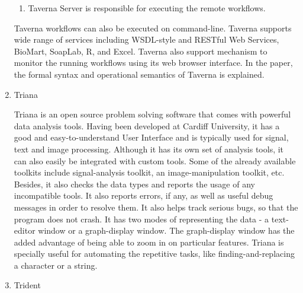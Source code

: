 \begin{enumerate}
\begin{enumerate}
\item {} 
Taverna Server is responsible for executing the remote
workflows.

\end{enumerate}

Taverna workflows can also be executed on command-line.  Taverna
supports wide range of services including WSDL-style and RESTful
Web Services, BioMart, SoapLab, R, and Excel. Taverna also support
mechanism to monitor the running workflows using its web browser
interface.  In the \label{\detokenize{i524/technologies:id13}}{\hyperref[\detokenize{i524/technologies:taverna-paper}]{\sphinxcrossref{{[}13{]}}}} paper, the formal syntax
and operational semantics of Taverna is explained.

\item {} 
Triana

\label{\detokenize{i524/technologies:id14}}{\hyperref[\detokenize{i524/technologies:trianadocumentation-1}]{\sphinxcrossref{{[}14{]}}}} Triana is an open source problem
solving software that comes with powerful data analysis tools.
Having been developed at Cardiff University, it has a good and
easy-to-understand User Interface and is typically used for signal,
text and image processing.  Although it has its own set of analysis
tools, it can also easily be integrated with custom tools.  Some of
the already available toolkits include signal-analysis toolkit, an
image-manipulation toolkit, etc.  Besides, it also checks the data
types and reports the usage of any incompatible tools.  It also
reports errors, if any, as well as useful debug messages in order
to resolve them.  It also helps track serious bugs, so that the
program does not crash.  It has two modes of representing the
data - a text-editor window or a graph-display window.  The
graph-display window has the added advantage of being able to zoom
in on particular features.  Triana is specially useful for
automating the repetitive tasks, like finding-and-replacing a
character or a string.

\item {} 
Trident


\end{enumerate}
